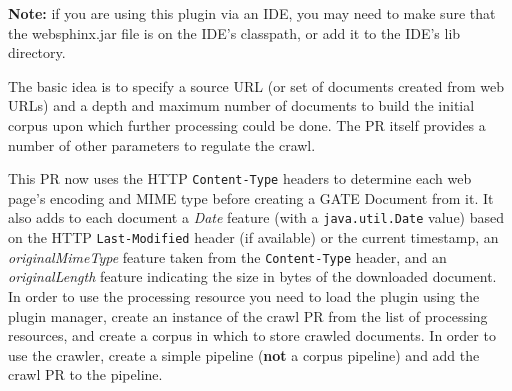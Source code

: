 \textbf{Note:} if you are using this plugin via an IDE, you may need to make
sure that the websphinx.jar file is on the IDE's classpath, or add it to the
IDE's lib directory.


The basic idea is to specify a source URL (or set of documents created from web
URLs) and a depth and maximum number of documents to build the initial corpus
upon which further processing could be done.  The PR itself provides a number of
other parameters to regulate the crawl.


This PR now uses the HTTP \texttt{Content-Type} headers to determine each web
page's encoding and MIME type before creating a GATE Document from it.  It also
adds to each document a \emph{Date} feature (with a \texttt{java.util.Date}
value) based on the HTTP \texttt{Last-Modified} header (if available) or the
current timestamp, an \emph{originalMimeType} feature taken from the
\texttt{Content-Type} header, and an \emph{originalLength} feature indicating
the size in bytes of the downloaded document.
In order to use the processing resource you need to load the plugin using the
plugin manager, create an instance of the crawl PR from the list of processing
resources, and create a corpus in which to store crawled documents. In order to
use the crawler, create a simple pipeline (\textbf{not} a corpus pipeline) and
add the crawl PR to the pipeline.

